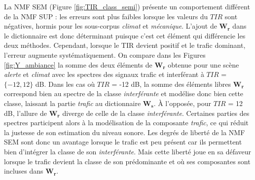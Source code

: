 La NMF SEM (Figure \ref{fig:TIR_class_semi}) présente un comportement différent de la NMF SUP : les erreurs sont plus faibles lorsque les valeurs du $TIR$ sont négatives, hormis pour les sous-corpus \textit{climat}  et \textit{mécanique}. L'ajout de $\mathbf{W_r}$ dans le dictionnaire est donc déterminant puisque c'est cet élément qui différencie les deux méthodes. Cependant, lorsque le TIR devient positif et le trafic dominant, l'erreur augmente systématiquement.
On compare dans les Figures \ref{fig:Y_ambiance} la somme des deux éléments de $\mathbf{W_r}$ obtenue pour une scène \textit{alerte} et \textit{climat} avec les spectres des signaux trafic et interférant à $TIR$ = $\lbrace -12, 12 \rbrace$ dB. Dans les cas où $TIR$ = -12 dB, la somme des éléments libres $\mathbf{W_r}$ correspond bien au spectre de la classe \textit{interférante} et modélise donc bien cette classe, laissant la partie \textit{trafic} au dictionnaire $\mathbf{W_s}$. À l'opposée, pour $TIR$ = 12 dB, l'allure de $\mathbf{W_r}$ diverge de celle de la classe \textit{interférante}. Certaines parties des spectres participent alors à la modélisation de la composante \textit{trafic}, ce qui réduit la justesse de son estimation du niveau sonore. Les degrés de liberté de la NMF SEM sont donc un avantage lorsque le trafic est peu présent car ils permettent bien d'intégrer la classe de son \textit{interférante}. Mais cette liberté joue en sa défaveur lorsque le trafic devient la classe de son prédominante et où ses composantes sont incluses dans $\mathbf{W_r}$.\\


